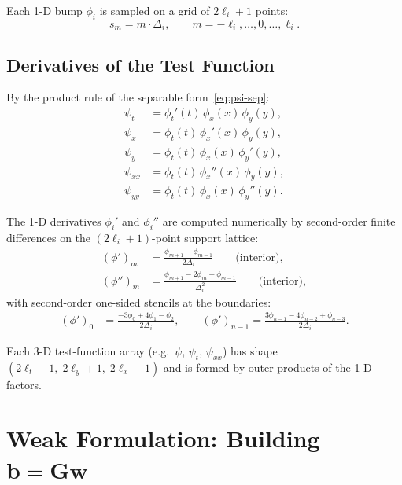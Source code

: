 \documentclass[11pt, letterpaper]{article}
\theoremstyle{definition}
\newcommand{\vw}{\mathbf{w}}
\newcommand{\vb}{\mathbf{b}}
\newcommand{\vG}{\mathbf{G}}
\begin{document}
Each 1-D bump $\phi_i$ is sampled on a grid of $2\ell_i + 1$ points:
\begin{equation}
  s_m = m \cdot \Delta_i, \qquad m = -\ell_i, \dots, 0, \dots, \ell_i.
\end{equation}

\subsection{Derivatives of the Test Function}
\label{sec:psi-derivs}

By the product rule of the separable form~\eqref{eq:psi-sep}:
\begin{align}
  \psi_t    &= \phi_t'(t)\,\phi_x(x)\,\phi_y(y),
  \label{eq:psi-t}\\
  \psi_x    &= \phi_t(t)\,\phi_x'(x)\,\phi_y(y), \\
  \psi_y    &= \phi_t(t)\,\phi_x(x)\,\phi_y'(y), \\
  \psi_{xx} &= \phi_t(t)\,\phi_x''(x)\,\phi_y(y), \\
  \psi_{yy} &= \phi_t(t)\,\phi_x(x)\,\phi_y''(y).
\end{align}

The 1-D derivatives $\phi_i'$ and $\phi_i''$ are computed numerically
by second-order finite differences on the $(2\ell_i+1)$-point
support lattice:
\begin{align}
  (\phi')_m &= \frac{\phi_{m+1} - \phi_{m-1}}{2\Delta_i}
  \qquad\text{(interior)},
  \label{eq:fd-first}\\
  (\phi'')_m &= \frac{\phi_{m+1} - 2\phi_m + \phi_{m-1}}{\Delta_i^{2}}
  \qquad\text{(interior)},
  \label{eq:fd-second}
\end{align}
with second-order one-sided stencils at the boundaries:
\begin{align}
  (\phi')_0    &= \frac{-3\phi_0 + 4\phi_1 - \phi_2}{2\Delta_i},
  \qquad
  (\phi')_{n-1} = \frac{3\phi_{n-1} - 4\phi_{n-2} + \phi_{n-3}}{2\Delta_i}.
\end{align}

Each 3-D test-function array (e.g.\ $\psi$, $\psi_t$, $\psi_{xx}$)
has shape $(2\ell_t+1,\; 2\ell_y+1,\; 2\ell_x+1)$ and is formed by
outer products of the 1-D factors.

\section{Weak Formulation: Building $\vb = \vG\vw$}
\label{sec:weak-system}
\end{document}
